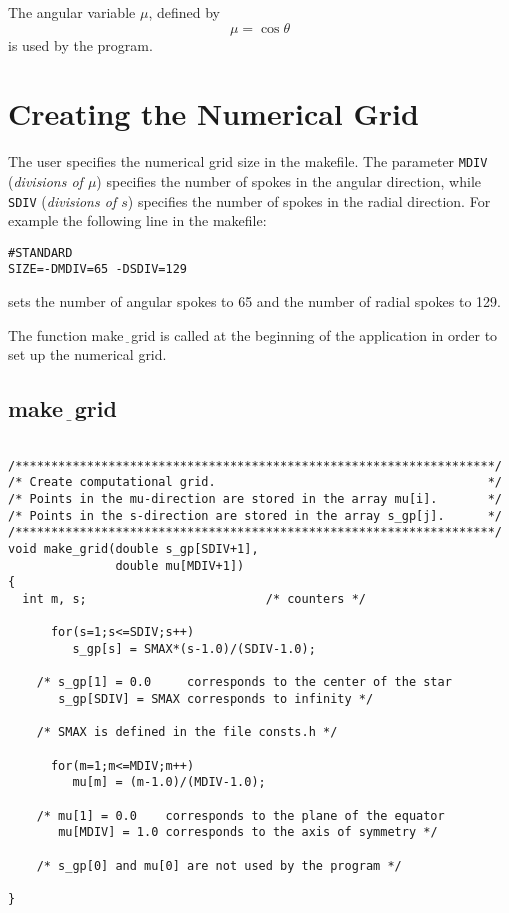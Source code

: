 The angular variable $\mu$, defined by
\[
\mu = \cos \theta 
\]
is used by the program.

\section{Creating the Numerical Grid}

The user specifies the numerical grid size in the makefile.
The parameter {\tt MDIV} ({\em divisions of $\mu$})
 specifies the number of spokes in the 
angular direction, while {\tt SDIV} ({\em divisions of $s$})
specifies the number of spokes in the radial direction. 
For example the following line in the makefile:
\vspace{2mm}
\begin{verbatim}
#STANDARD
SIZE=-DMDIV=65 -DSDIV=129
\end{verbatim}
\vspace{2mm}
sets the number of angular spokes to 65 and the number of 
radial spokes to 129. 

The function make$\underline{\;\;}$grid is called at the 
beginning of the application in order to set up the numerical 
grid. 

\subsection{make$\underline{\;\;}$grid}

\begin{verbatim}

/*******************************************************************/
/* Create computational grid.                                      */
/* Points in the mu-direction are stored in the array mu[i].       */
/* Points in the s-direction are stored in the array s_gp[j].      */
/*******************************************************************/
void make_grid(double s_gp[SDIV+1], 
               double mu[MDIV+1])                        
{ 
  int m, s;                         /* counters */
    
      for(s=1;s<=SDIV;s++) 
         s_gp[s] = SMAX*(s-1.0)/(SDIV-1.0);

	/* s_gp[1] = 0.0     corresponds to the center of the star
	   s_gp[SDIV] = SMAX corresponds to infinity */

	/* SMAX is defined in the file consts.h */

      for(m=1;m<=MDIV;m++) 
         mu[m] = (m-1.0)/(MDIV-1.0);

	/* mu[1] = 0.0    corresponds to the plane of the equator 
	   mu[MDIV] = 1.0 corresponds to the axis of symmetry */

	/* s_gp[0] and mu[0] are not used by the program */

}

\end{verbatim}



